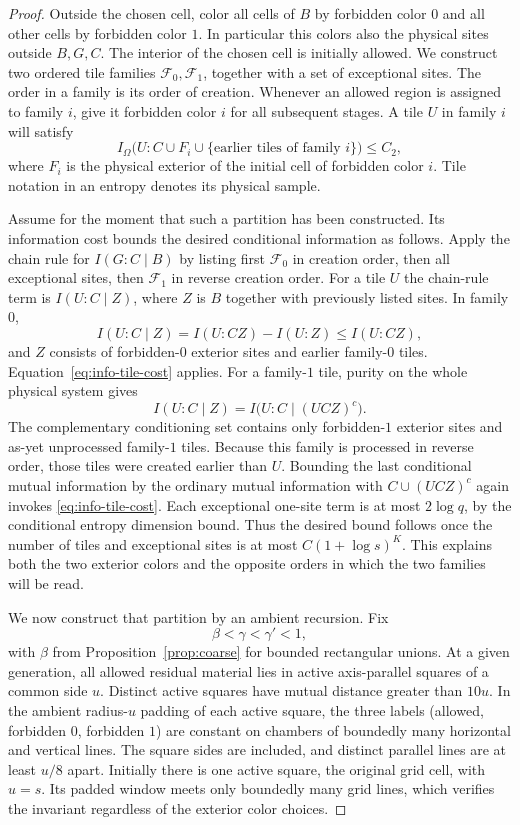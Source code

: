 \begin{proof}
Outside the chosen cell, color all cells of $B$ by forbidden color $0$
and all other cells by forbidden color $1$.  In particular this colors
also the physical sites outside $B,G,C$.  The interior of the chosen
cell is initially allowed.  We construct two ordered tile families
$\mathcal F_0,\mathcal F_1$, together with a set of exceptional sites.
The order in a family is its order of creation.  Whenever an allowed
region is assigned to family $i$, give it forbidden color $i$ for all
subsequent stages.  A tile $U$ in family $i$ will satisfy
\begin{equation}
 I_\Omega\bigl(U:C\cup F_i\cup
       \{\text{earlier tiles of family }i\}\bigr)\le C_2,
 \label{eq:info-tile-cost}
\end{equation}
where $F_i$ is the physical exterior of the initial cell of forbidden
color $i$.  Tile notation in an entropy denotes its physical sample.

Assume for the moment that such a partition has been constructed.  Its
information cost bounds the desired conditional information as follows.
Apply the chain rule
for $I(G:C\mid B)$ by listing first $\mathcal F_0$ in creation order,
then all exceptional sites, then $\mathcal F_1$ in reverse creation
order.  For a tile $U$ the chain-rule term is $I(U:C\mid Z)$, where
$Z$ is $B$ together with previously listed sites.  In family $0$,
\[
 I(U:C\mid Z)=I(U:CZ)-I(U:Z)\le I(U:CZ),
\]
and $Z$ consists of forbidden-$0$ exterior sites and earlier
family-$0$ tiles.  Equation~\eqref{eq:info-tile-cost} applies.
For a family-$1$ tile, purity on the whole physical system gives
\[
 I(U:C\mid Z)=I\bigl(U:C\mid(UCZ)^c\bigr).
\]
The complementary conditioning set contains only forbidden-$1$
exterior sites and as-yet unprocessed family-$1$ tiles.  Because this
family is processed in reverse order, those tiles were created earlier
than $U$.  Bounding the last conditional mutual information by the
ordinary mutual information with $C\cup(UCZ)^c$ again invokes
\eqref{eq:info-tile-cost}.  Each exceptional one-site term is at most
$2\log q$, by the conditional entropy dimension bound.  Thus the desired
bound follows once the number of tiles and exceptional sites is at most
$C(1+\log s)^K$.  This explains both the two exterior
colors and the opposite orders in which the two families will be read.

We now construct that partition by an ambient recursion.  Fix
\[
 \beta<\gamma<\gamma'<1,
\]
with $\beta$ from Proposition~\ref{prop:coarse} for bounded rectangular
unions.  At a given generation, all allowed residual material lies in
active axis-parallel squares of a common side $u$.  Distinct active
squares have mutual distance greater than $10u$.  In the ambient
radius-$u$ padding of each active square, the three labels (allowed,
forbidden $0$, forbidden $1$) are constant on chambers of boundedly
many horizontal and vertical lines.  The square sides are included,
and distinct parallel lines are at least $u/8$ apart.  Initially there
is one active square, the original grid cell, with $u=s$.  Its padded
window meets only boundedly many grid lines, which verifies the
invariant regardless of the exterior color choices.


\end{proof}

